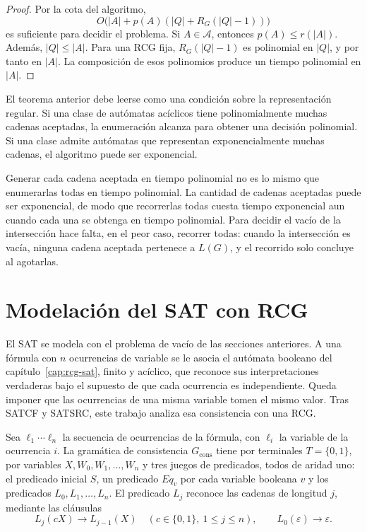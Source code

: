\documentclass{report}
\theoremstyle{definition}
\theoremstyle{plain}
\theoremstyle{remark}
\begin{document}
\begin{proof}
Por la cota del algoritmo,
\[
  O\bigl( |A| + p(A)(|Q| + R_G(|Q|-1)) \bigr)
\]
es suficiente para decidir el problema. Si $A \in \mathcal{A}$,
entonces $p(A) \le r(|A|)$.
Además, $|Q| \le |A|$. Para una RCG fija, $R_G(|Q|-1)$ es polinomial en
$|Q|$, y por tanto en $|A|$. La composición de esos polinomios produce
un tiempo polinomial en $|A|$.
\end{proof}

El teorema anterior debe leerse como una condición sobre la
representación regular. Si una clase de autómatas acíclicos tiene
polinomialmente muchas cadenas aceptadas, la
enumeración alcanza para obtener una decisión polinomial. Si una clase
admite autómatas que representan exponencialmente muchas cadenas, el
algoritmo puede ser exponencial.

Generar cada cadena aceptada en tiempo polinomial no es lo mismo que
enumerarlas todas en tiempo polinomial. La cantidad de cadenas
aceptadas puede ser exponencial, de modo que recorrerlas todas cuesta
tiempo exponencial aun cuando cada una se obtenga en tiempo polinomial.
Para decidir el vacío de la intersección hace falta, en el peor caso,
recorrer todas: cuando la intersección es vacía, ninguna cadena aceptada
pertenece a $L(G)$, y el recorrido solo concluye al agotarlas.

\section{Modelación del SAT con RCG}
\label{sec:modelacion-sat}

El SAT se modela con el problema de vacío de las secciones anteriores. A
una fórmula con $n$ ocurrencias de variable se le asocia el autómata
booleano del capítulo~\ref{cap:rcg-sat}, finito y acíclico, que reconoce
sus interpretaciones verdaderas bajo el supuesto de que cada ocurrencia
es independiente. Queda imponer que las ocurrencias de una misma
variable tomen el mismo valor. Tras SATCF y SATSRC, este
trabajo analiza esa consistencia con una RCG.

Sea $\ell_1\cdots\ell_n$ la secuencia de ocurrencias de la fórmula, con
$\ell_i$ la variable de la ocurrencia $i$. La gramática de consistencia
$G_{\mathrm{cons}}$ tiene por terminales $T=\{0,1\}$, por variables
$X, W_0, W_1, \ldots, W_n$ y tres juegos de predicados, todos de
aridad uno: el predicado inicial $S$, un predicado $Eq_v$ por cada
variable booleana $v$ y los predicados $L_0, L_1, \ldots, L_n$. El
predicado $L_j$ reconoce las cadenas de longitud $j$, mediante las
cláusulas
\[
  L_j(cX) \to L_{j-1}(X) \quad (c \in \{0,1\},\ 1 \le j \le n),
  \qquad L_0(\varepsilon) \to \varepsilon.
\]
\end{document}
